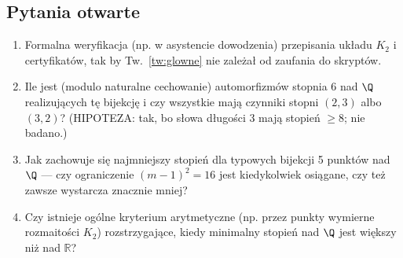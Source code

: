 \subsection*{Pytania otwarte}
\begin{enumerate}
\item Formalna weryfikacja (np. w asystencie dowodzenia) przepisania układu $K_2$ i
certyfikatów, tak by Tw.~\ref{tw:glowne} nie zależał od zaufania do skryptów.
\item Ile jest (modulo naturalne cechowanie) automorfizmów stopnia 6 nad $\Q$ realizujących
tę bijekcję i czy wszystkie mają czynniki stopni $(2,3)$ albo $(3,2)$? (HIPOTEZA: tak, bo
słowa długości 3 mają stopień $\ge8$; nie badano.)
\item Jak zachowuje się najmniejszy stopień dla typowych bijekcji 5 punktów nad $\Q$ ---
czy ograniczenie $(m-1)^2=16$ jest kiedykolwiek osiągane, czy też zawsze wystarcza znacznie
mniej?
\item Czy istnieje ogólne kryterium arytmetyczne (np. przez punkty wymierne rozmaitości
$K_2$) rozstrzygające, kiedy minimalny stopień nad $\Q$ jest większy niż nad $\mathbb R$?
\end{enumerate}
